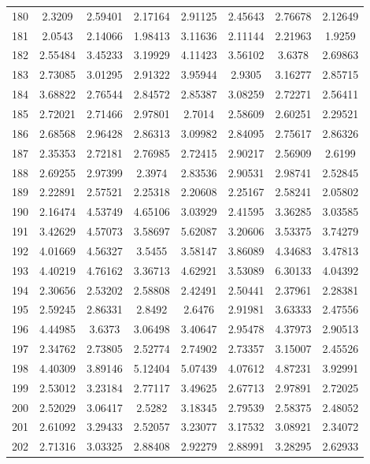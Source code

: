 \begin{center}
\begin{longtable}{cccccccc}
180 & 2.3209 & 2.59401 & 2.17164 & 2.91125 & 2.45643 & 2.76678 & 2.12649\\
181 & 2.0543 & 2.14066 & 1.98413 & 3.11636 & 2.11144 & 2.21963 & 1.9259\\
182 & 2.55484 & 3.45233 & 3.19929 & 4.11423 & 3.56102 & 3.6378 & 2.69863\\
183 & 2.73085 & 3.01295 & 2.91322 & 3.95944 & 2.9305 & 3.16277 & 2.85715\\
184 & 3.68822 & 2.76544 & 2.84572 & 2.85387 & 3.08259 & 2.72271 & 2.56411\\
185 & 2.72021 & 2.71466 & 2.97801 & 2.7014 & 2.58609 & 2.60251 & 2.29521\\
186 & 2.68568 & 2.96428 & 2.86313 & 3.09982 & 2.84095 & 2.75617 & 2.86326\\
187 & 2.35353 & 2.72181 & 2.76985 & 2.72415 & 2.90217 & 2.56909 & 2.6199\\
188 & 2.69255 & 2.97399 & 2.3974 & 2.83536 & 2.90531 & 2.98741 & 2.52845\\
189 & 2.22891 & 2.57521 & 2.25318 & 2.20608 & 2.25167 & 2.58241 & 2.05802\\
190 & 2.16474 & 4.53749 & 4.65106 & 3.03929 & 2.41595 & 3.36285 & 3.03585\\
191 & 3.42629 & 4.57073 & 3.58697 & 5.62087 & 3.20606 & 3.53375 & 3.74279\\
192 & 4.01669 & 4.56327 & 3.5455 & 3.58147 & 3.86089 & 4.34683 & 3.47813\\
193 & 4.40219 & 4.76162 & 3.36713 & 4.62921 & 3.53089 & 6.30133 & 4.04392\\
194 & 2.30656 & 2.53202 & 2.58808 & 2.42491 & 2.50441 & 2.37961 & 2.28381\\
195 & 2.59245 & 2.86331 & 2.8492 & 2.6476 & 2.91981 & 3.63333 & 2.47556\\
196 & 4.44985 & 3.6373 & 3.06498 & 3.40647 & 2.95478 & 4.37973 & 2.90513\\
197 & 2.34762 & 2.73805 & 2.52774 & 2.74902 & 2.73357 & 3.15007 & 2.45526\\
198 & 4.40309 & 3.89146 & 5.12404 & 5.07439 & 4.07612 & 4.87231 & 3.92991\\
199 & 2.53012 & 3.23184 & 2.77117 & 3.49625 & 2.67713 & 2.97891 & 2.72025\\
200 & 2.52029 & 3.06417 & 2.5282 & 3.18345 & 2.79539 & 2.58375 & 2.48052\\
201 & 2.61092 & 3.29433 & 2.52057 & 3.23077 & 3.17532 & 3.08921 & 2.34072\\
202 & 2.71316 & 3.03325 & 2.88408 & 2.92279 & 2.88991 & 3.28295 & 2.62933\\

\end{longtable}
\end{center}

